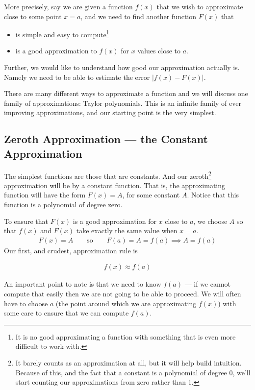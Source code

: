 More precisely, say we are given a function $f(x)$ that we wish to approximate
close to some point $x=a$, and we need to find another function $F(x)$
that
\begin{itemize}
 \item is simple and easy to compute\footnote{It is no good approximating a
function with something that is even more difficult to work with.}
 \item is a good approximation to $f(x)$ for $x$ values close to $a$.
\end{itemize}
Further, we would like to understand how good our approximation actually is.
Namely we need to be able to estimate the error $|f(x)-F(x)|$.

There are many different ways to approximate a function and we will discuss one
family of approximations: Taylor polynomials. This is an infinite family of
ever improving approximations, and our starting point is the very simplest.


\subsection{Zeroth Approximation --- the Constant Approximation}\label{ssec const approx}
The simplest functions are those that are constants. And our
zeroth\footnote{It barely counts as an approximation at all, but it will help
build intuition. Because of this, and the fact that a constant is a
polynomial of degree 0,  we'll start counting our approximations from zero
rather than 1.} approximation will be by a constant function. That is, the
approximating function will have the form $F(x)=A$, for some constant $A$.
Notice that this function is a polynomial of degree zero.


To ensure that $F(x)$ is a good approximation for $x$ close to $a$, we choose
$A$ so that $f(x)$ and $F(x)$ take exactly the same value when $x=a$.
\begin{align*}
F(x)=A\qquad\text{so}\qquad F(a)=A=f(a)\implies A=f(a)
\end{align*}
Our first, and crudest, approximation rule is
\begin{impeqn}\label{eq:constApprox}
\begin{align*}
f(x)\approx f(a)
\end{align*}
\end{impeqn}
\noindent An important point to note is that we need to know $f(a)$ --- if we cannot
compute that easily then we are not going to be able to proceed. We will often
have to choose $a$ (the point around which we are approximating $f(x)$) with
some care to ensure that we can compute $f(a)$.


